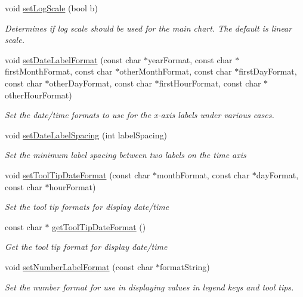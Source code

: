 \begin{DoxyCompactItemize}
void \hyperlink{class_finance_chart_a8a0f9c954f14c12dbf8e56eb2ce472de}{set\+Log\+Scale} (bool b)
\begin{DoxyCompactList}\small\item\em Determines if log scale should be used for the main chart. The default is linear scale. \end{DoxyCompactList}\item 
void \hyperlink{class_finance_chart_a8897f2ca59cf825d9f56319342ac21b1}{set\+Date\+Label\+Format} (const char $\ast$year\+Format, const char $\ast$first\+Month\+Format, const char $\ast$other\+Month\+Format, const char $\ast$first\+Day\+Format, const char $\ast$other\+Day\+Format, const char $\ast$first\+Hour\+Format, const char $\ast$other\+Hour\+Format)
\begin{DoxyCompactList}\small\item\em Set the date/time formats to use for the x-\/axis labels under various cases. \end{DoxyCompactList}\item 
void \hyperlink{class_finance_chart_a5a1a5cc70635560627b25f8c84a7fb84}{set\+Date\+Label\+Spacing} (int label\+Spacing)
\begin{DoxyCompactList}\small\item\em Set the minimum label spacing between two labels on the time axis \end{DoxyCompactList}\item 
void \hyperlink{class_finance_chart_a1e92e3f65cb168efded2c008b1a6c8ed}{set\+Tool\+Tip\+Date\+Format} (const char $\ast$month\+Format, const char $\ast$day\+Format, const char $\ast$hour\+Format)
\begin{DoxyCompactList}\small\item\em Set the tool tip formats for display date/time \end{DoxyCompactList}\item 
const char $\ast$ \hyperlink{class_finance_chart_ad9bb91fe15acd6895f4586742db4e0b1}{get\+Tool\+Tip\+Date\+Format} ()
\begin{DoxyCompactList}\small\item\em Get the tool tip format for display date/time \end{DoxyCompactList}\item 
void \hyperlink{class_finance_chart_abc4de6b32c4cfb3ea99b0becd05fc11c}{set\+Number\+Label\+Format} (const char $\ast$format\+String)
\begin{DoxyCompactList}\small\item\em Set the number format for use in displaying values in legend keys and tool tips. \end{DoxyCompactList}\item 

\end{DoxyCompactItemize}
